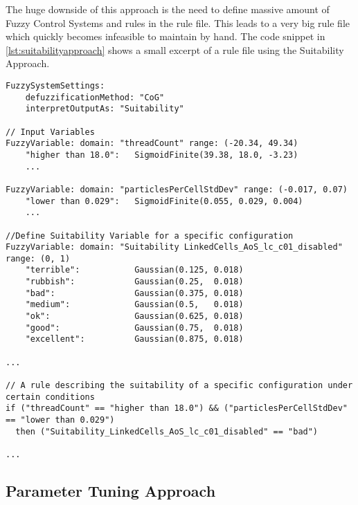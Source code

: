 The huge downside of this approach is the need to define massive amount of Fuzzy Control Systems and rules in the rule file. This leads to a very big rule file which quickly becomes infeasible to maintain by hand. The code snippet in \autoref{lst:suitabilityapproach} shows a small excerpt of a rule file using the Suitability Approach.


\begin{lstlisting}[language=FuzzyLanguage, caption={Rule snippet depicting the Suitability Approach}, label={lst:suitabilityapproach}]
FuzzySystemSettings:
    defuzzificationMethod: "CoG"
    interpretOutputAs: "Suitability"

// Input Variables
FuzzyVariable: domain: "threadCount" range: (-20.34, 49.34)
    "higher than 18.0":   SigmoidFinite(39.38, 18.0, -3.23)
    ...

FuzzyVariable: domain: "particlesPerCellStdDev" range: (-0.017, 0.07)
    "lower than 0.029":   SigmoidFinite(0.055, 0.029, 0.004)
    ...

//Define Suitability Variable for a specific configuration
FuzzyVariable: domain: "Suitability LinkedCells_AoS_lc_c01_disabled" range: (0, 1)
    "terrible":           Gaussian(0.125, 0.018)
    "rubbish":            Gaussian(0.25,  0.018)
    "bad":                Gaussian(0.375, 0.018)
    "medium":             Gaussian(0.5,   0.018)
    "ok":                 Gaussian(0.625, 0.018)
    "good":               Gaussian(0.75,  0.018)
    "excellent":          Gaussian(0.875, 0.018)

...

// A rule describing the suitability of a specific configuration under certain conditions
if ("threadCount" == "higher than 18.0") && ("particlesPerCellStdDev" == "lower than 0.029")
  then ("Suitability_LinkedCells_AoS_lc_c01_disabled" == "bad")

...
\end{lstlisting}


\subsection{Parameter Tuning Approach}

